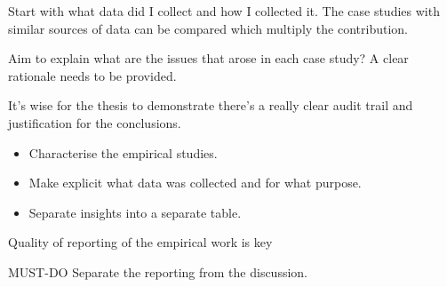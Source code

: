 Start with what data did I collect and how I collected it. The case studies with similar sources of data can be compared which multiply the contribution.

Aim to explain what are the issues that arose in each case study?
A clear rationale needs to be provided. 

It's wise for the thesis to demonstrate there's a really clear audit trail and justification for the conclusions.

\begin{itemize}
    \item Characterise the empirical studies.
    \item Make explicit what data was collected and for what purpose. 
    \item Separate insights into a separate table. 
\end{itemize}

Quality of reporting of the empirical work is key


MUST-DO Separate the reporting from the discussion.


